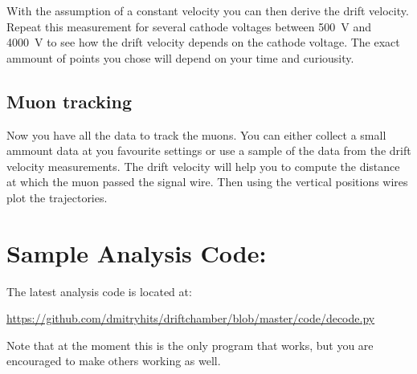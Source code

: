 \documentclass[12pt]{article}
\begin{document}
 With the assumption of a constant velocity you can then derive the drift velocity. Repeat this measurement for several cathode voltages between \SI{500}{\volt} and \SI{4000}{\volt} to see how the drift velocity depends on the cathode voltage. The exact ammount of points you chose will depend on your time and curiousity.

\subsection{Muon tracking}

Now you have all the data to track the muons. You can either collect a small ammount data at you favourite settings or use a sample of the data from the drift velocity measurements.  The drift velocity will help you to compute the distance at which the muon passed the signal wire. Then using the vertical positions wires plot the trajectories.




\pagebreak

\appendix
\section{Sample Analysis Code:}

The latest analysis code is located at:

\url{https://github.com/dmitryhits/driftchamber/blob/master/code/decode.py}

Note that at the moment this is the only program that works, but you are encouraged to make others working as well.



\end{document}
